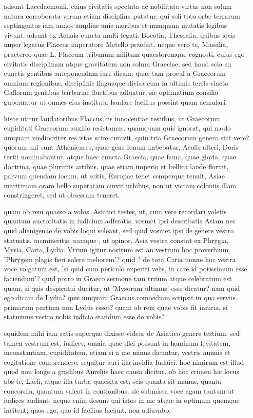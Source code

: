  adsunt Lacedaemonii, cuius civitatis spectata ac nobilitata virtus non solum natura corroborata verum etiam disciplina putatur; qui soli toto orbe terrarum septingentos iam annos amplius unis moribus et numquam mutatis legibus vivunt. adsunt ex Achaia cuncta multi legati, Boeotia, Thessalia, quibus locis nuper legatus Flaccus imperatore Metello praefuit. neque vero te, Massilia, praetereo quae L. Flaccum tribunum militum quaestoremque cognosti; cuius ego civitatis disciplinam atque gravitatem non solum Graeciae, sed haud scio an cunctis gentibus anteponendam iure dicam; quae tam procul a Graecorum omnium regionibus, disciplinis linguaque divisa cum in ultimis terris cincta Gallorum gentibus barbariae fluctibus adluatur, sic optimatium consilio gubernatur ut omnes eius instituta laudare facilius possint quam aemulari.

 hisce utitur laudatoribus Flaccus,his innocentiae testibus, ut Graecorum cupiditati Graecorum auxilio resistamus. quamquam quis ignorat, qui modo umquam mediocriter res istas scire curavit, quin tria Graecorum genera sint vere? quorum uni sunt Athenienses, quae gens Ionum habebatur, Aeolis alteri, Doris tertii nominabantur. atque haec cuncta Graecia, quae fama, quae gloria, quae doctrina, quae plurimis artibus, quae etiam imperio et bellica laude floruit, parvum quendam locum, ut scitis, Europae tenet semperque tenuit, Asiae maritimam oram bello superatam cinxit urbibus, non ut victam coloniis illam constringeret, sed ut obsessam teneret.

 quam ob rem quaeso a vobis, Asiatici testes, ut, cum vere recordari voletis quantum auctoritatis in iudicium adferatis, vosmet ipsi describatis Asiam nec quid alienigenae de vobis loqui soleant, sed quid vosmet ipsi de genere vestro statuatis, memineritis. namque , ut opinor, Asia vestra constat ex Phrygia, Mysia, Caria, Lydia. Vtrum igitur nostrum est an vestrum hoc proverbium, 'Phrygem plagis fieri solere meliorem'? quid ? de tota Caria nonne hoc vestra voce volgatum est, 'si quid cum periculo experiri velis, in care id potissimum esse faciendum'? quid porro in Graeco sermone tam tritum atque celebratum est quam, si quis despicatui ducitur, ut 'Mysorum ultimus' esse dicatur? nam quid ego dicam de Lydia? quis umquam Graecus comoediam scripsit in qua servus primarum partium non Lydus esset? quam ob rem quae vobis fit iniuria, si statuimus vestro nobis iudicio standum esse de vobis?

 equidem mihi iam satis superque dixisse videor de Asiatico genere testium; sed tamen vestrum est, iudices, omnia quae dici possunt in hominum levitatem, inconstantiam, cupiditatem, etiam si a me minus dicuntur, vestris animis et cogitatione comprendere. sequitur auri illa invidia Iudaici. hoc nimirum est illud quod non longe a gradibus Aureliis haec causa dicitur. ob hoc crimen hic locus abs te, Laeli, atque illa turba quaesita est; scis quanta sit manus, quanta concordia, quantum valeat in contionibus. sic submissa voce agam tantum ut iudices audiant; neque enim desunt qui istos in me atque in optimum quemque incitent; quos ego, quo id facilius faciant, non adiuvabo.

